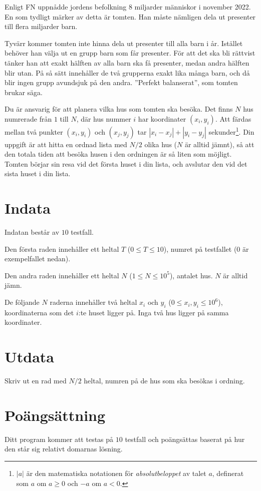 Enligt FN uppnådde jordens befolkning 8 miljarder människor i november 2022.
En som tydligt märker av detta är tomten. Han måste nämligen dela ut presenter till flera miljarder barn.

Tyvärr kommer tomten inte hinna dela ut presenter till alla barn i år.
Istället behöver han välja ut en grupp barn som får presenter.
För att det ska bli rättvist tänker han att exakt hälften av alla barn ska få presenter, medan andra hälften blir utan.
På så sätt innehåller de två grupperna exakt lika många barn, och då blir ingen grupp avundsjuk på den andra.
''Perfekt balanserat'', som tomten brukar säga.


Du är ansvarig för att planera vilka hus som tomten ska besöka. Det finns
$N$ hus numrerade från $1$ till $N$, där hus nummer $i$ har koordinater $(x_i, y_i)$. Att färdas mellan
två punkter $(x_i, y_i)$ och $(x_j, y_j)$ tar $|x_i-x_j| + |y_i-y_j|$ sekunder\footnote{$|a|$ är den matematiska notationen för \emph{absolutbeloppet} av talet $a$,
definerat som $a$ om $a \ge 0$ och $-a$ om $a < 0$.}. Din uppgift är 
att hitta en ordnad lista med $N/2$ olika hus ($N$ är alltid jämnt), så att den totala tiden att besöka husen
i den ordningen är så liten som möjligt.
Tomten börjar sin resa vid det första huset i din lista, och avslutar den vid det sista huset i din lista.

\section*{Indata}
Indatan består av $10$ testfall.

Den första raden innehåller ett heltal $T$ ($0 \leq T \leq 10$), numret på testfallet ($0$ är exempelfallet nedan).

Den andra raden innehåller ett heltal $N$ ($1 \le N \le 10^5$), antalet hus. $N$ är alltid jämn.

De följande $N$ raderna innehåller två heltal $x_i$ och $y_i$ ($0 \le x_i, y_i \le 10^6$), koordinaterna
som det $i$:te huset ligger på. 
Inga två hus ligger på samma koordinater.

\section*{Utdata}
Skriv ut en rad med $N/2$ heltal, numren på de hus som ska besökas i ordning.

\section*{Poängsättning}
Ditt program kommer att testas på $10$ testfall och poängsättas baserat på hur den står sig relativt domarnas lösning.

